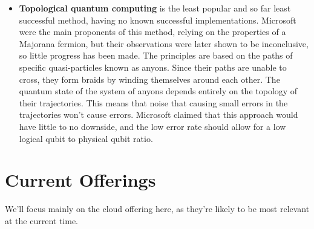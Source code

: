 \documentclass{article}
\theoremstyle{definition}
\begin{document}
\begin{itemize}
    \item \textbf{Topological quantum computing} is the least popular and so far least successful method, having no known successful implementations. Microsoft were the main proponents of this method, relying on the properties of a Majorana fermion, but their observations were later shown to be inconclusive, so little progress has been made. The principles are based on the paths of specific quasi-particles known as anyons. Since their paths are unable to cross, they form braids by winding themselves around each other. The quantum state of the system of anyons depends entirely on the topology of their trajectories. This means that noise that causing small errors in the trajectories won't cause errors. Microsoft claimed that this approach would have little to no downside, and the low error rate should allow for a low logical qubit to physical qubit ratio. 
\end{itemize}


\section{Current Offerings}
We'll focus mainly on the cloud offering here, as they're likely to be most relevant at the current time.
\end{document}
